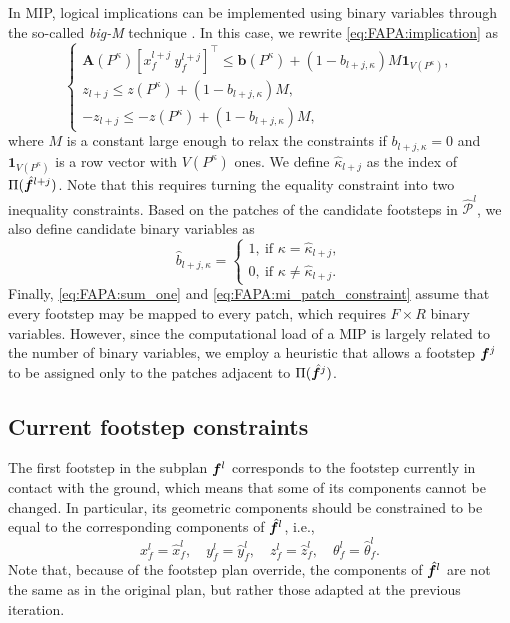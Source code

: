 In MIP, logical implications can be implemented using binary variables through
the so-called {\em big-M} technique
\cite{Afonso2020TaskAllocationTrajectoryPlanning}. In this case, we rewrite
\eqref{eq:FAPA:implication} as
\begin{equation}
	\begin{cases}
		\bm{A}\left(P^\kappa\right)\left[ x_f^{l+j} \ y_f^{l+j} \right]^\top \leq \bm{b}\left(P^\kappa\right) + \left(1 - b_{l+j,\kappa}\right) M \bm{1}_{V(P^\kappa)}, \\
		z_{l+j} \leq z\left(P^\kappa\right) + \left(1 - b_{l+j,\kappa}\right) M, \\
		-z_{l+j} \leq -z(P^\kappa) + (1 - b_{l+j,\kappa}) M,
	\end{cases}
\label{eq:FAPA:mi_patch_constraint}
\end{equation}
where $M$ is a constant large enough to relax the constraints if
$b_{l+j,\kappa}=0$ and $\bm{1}_{V(P^\kappa)}$ is a row vector with
$V(P^\kappa)$ ones. We define $\hat \kappa_{l+j}$ as the index of
$\Pi(\hat {{\bm{f}}}^{l+j})$. Note that this requires turning the equality constraint
into two inequality constraints. Based on the patches of the candidate footsteps
in $\mathcal{\hat P}^l$, we also define candidate binary variables as
\begin{equation*}
    \hat b_{l+j,\kappa} =
    \begin{cases}
        1, \ \text{if } \kappa = \hat \kappa_{l+j}, \\
        0, \ \text{if } \kappa \neq \hat \kappa_{l+j}.
    \end{cases}
\end{equation*}
Finally, \eqref{eq:FAPA:sum_one} and \eqref{eq:FAPA:mi_patch_constraint}
assume that every footstep may be mapped to every patch, which requires
$F \times R$ binary variables. However, since the computational load of a
MIP is largely related to the number of binary variables, we employ a heuristic
that allows a footstep ${\bm{f}}^j$ to be assigned only to the patches adjacent to
$\Pi(\hat {{\bm{f}}}^j)$.

\subsection{Current footstep constraints}
The first footstep in the subplan ${\bm{f}}^l$ corresponds to the footstep
currently in contact with the ground, which means that some of its components
cannot be changed. In particular, its geometric components should be
constrained to be equal to the corresponding components of $\hat{{\bm{f}}}^l$, i.e.,
\begin{equation}
    x_f^l = \hat x_f^l, \quad
    y_f^l = \hat y_f^l, \quad
    z_f^l = \hat z_f^l, \quad
    \theta_f^l = \hat \theta_f^l.
    \label{eq:FAPA:current_geometric_constraint}
\end{equation}
Note that, because of the footstep plan override, the components of
$\hat{{\bm{f}}}^l$ are not the same as in the original plan, but rather those
adapted at the previous iteration.


